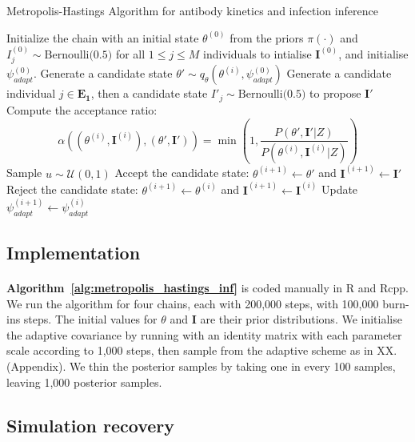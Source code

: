 \begin{algorithm}[H]
\caption{Metropolis-Hastings Algorithm for antibody kinetics and infection inference}
\label{alg:metropolis_hastings_inf}
\begin{algorithmic}[1]
    \State Initialize the chain with an initial state $\theta^{(0)}$ from the priors $\pi(\cdot)$ and $I^{(0)}_{j} \sim \text{Bernoulli(0.5)}$ for all $1 \leq j \leq M$ individuals to intialise $\mathbf{I}^{(0)}$, and initialise $\psi^{(0)}_{adapt}$.
        \State Generate a candidate state $\theta' \sim q_\theta\left(\theta^{(i)}, \psi^{(0)}_{adapt}\right)$
        \State Generate a candidate individual $j \in \mathbf{E_1} $, then a candidate state $I'_j \sim \text{Bernoulli(0.5)}$ to propose $\mathbf{I}'$
        \State Compute the acceptance ratio:
        \[
        \alpha((\theta^{(i)}, \mathbf{I}^{(i)}),( \theta',  \mathbf{I}')) = \min\left(1, \frac{P(\theta', \mathbf{I}'|Z)}{P(\theta^{(i)}, \mathbf{I}^{(i)}|Z)} \right)
        \]
        \State Sample $u \sim \mathcal{U}(0, 1)$
            \State Accept the candidate state: $\theta^{(i+1)} \leftarrow \theta'$ and $\mathbf{I}^{(i + 1)}  \leftarrow \mathbf{I}'$
        \Else
            \State Reject the candidate state: $\theta^{(i+1)} \leftarrow \theta^{(i)}$ and $\mathbf{I}^{(i + 1)}  \leftarrow \mathbf{I}^{(i)} $
        \EndIf 
        \State Update $ \psi^{(i + 1)}_{adapt} \leftarrow \psi^{(i)}_{adapt}$
    \EndFor
\end{algorithmic} 
\end{algorithm}


\subsection{Implementation }
\paragraph{}  \textbf{Algorithm~\ref{alg:metropolis_hastings_inf}} is coded manually in R and Rcpp. We run the algorithm for four chains, each with 200,000 steps, with 100,000 burn-ins steps. The initial values for $\theta$ and $\mathbf{I}$ are their prior distributions. We initialise the adaptive covariance by running with an identity matrix with each parameter scale according to 1,000 steps, then sample from the adaptive scheme as in XX. (Appendix). We thin the posterior samples by taking one in every 100 samples, leaving 1,000 posterior samples.

\subsection{Simulation recovery }
